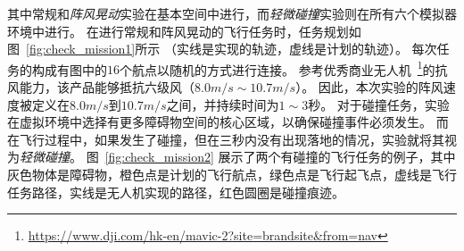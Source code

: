 其中常规和\emph{阵风晃动}实验在基本空间中进行，而\emph{轻微碰撞}实验则在所有六个模拟器环境中进行。
在进行常规和阵风晃动的飞行任务时，任务规划如图~\ref{fig:check_mission1}所示 （实线是实现的轨迹，虚线是计划的轨迹）。
每次任务的构成有图中的$16$个航点以随机的方式进行连接。
参考优秀商业无人机~\footnote{\url{https://www.dji.com/hk-en/mavic-2?site=brandsite&from=nav}}的抗风能力，该产品能够抵抗六级风（$8.0m/s \sim 10.7m/s$）。
因此，本次实验的阵风速度被定义在$8.0m/s$到$10.7m/s$之间，并持续时间为$1\sim3$秒。
对于碰撞任务，实验在虚拟环境中选择有更多障碍物空间的核心区域，以确保碰撞事件必须发生。
而在飞行过程中，如果发生了碰撞，但在三秒内没有出现落地的情况，实验就将其视为\emph{轻微碰撞}。
图~\ref{fig:check_mission2} 展示了两个有碰撞的飞行任务的例子，其中灰色物体是障碍物，橙色点是计划的飞行航点，绿色点是飞行起飞点，虚线是飞行任务路径，实线是无人机实现的路径，红色圆圈是碰撞痕迹。

